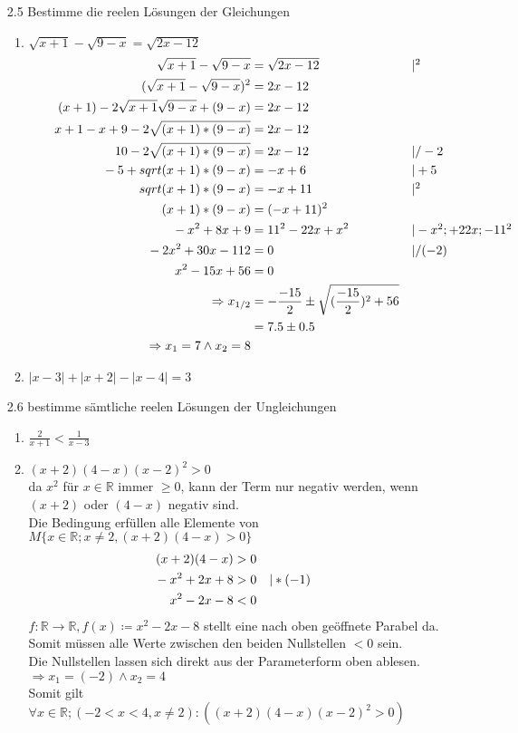 \documentclass[12pt,letterpaper]{article}
\newcommand{\alignleft}[1]{\tag*{\llap{\makebox[\linewidth][l]{$#1$}}}}
\newcommand{\LLeftrightarrow}{ \alignleft{\Leftrightarrow}}
\newcommand{\eqinfo}[1]{&\makebox[2cm][l]{$\vert #1$}}
\newcommand{\Eqn}[3]{#1 &#2 #3}
\newcommand{\eqn}[2]{\LLeftrightarrow\Eqn{#1}{=}{#2}\\}
\newcommand{\eqni}[3]{\LLeftrightarrow\Eqn{#1}{=}{#2}\eqinfo{#3}\\}
\newcommand{\eqnfi}[3]{\Eqn{#1}{=}{#2}\eqinfo{#3}\\}
\newcommand{\geqnf}[3]{\Eqn{#1}{#2}{#3}\\}
\newcommand{\geqn}[3]{\LLeftrightarrow\Eqn{#1}{#2}{#3}\\}
\newcommand{\geqni}[4]{\LLeftrightarrow\Eqn{#1}{#2}{#3}\eqinfo{#4}\\}
\begin{document}
\begin{enumerate}
\item [2.5] Bestimme die reelen Lösungen der Gleichungen
\begin{enumerate}
\item $\sqrt{x+1}-\sqrt{9-x}=\sqrt{2x-12}$
\begin{align*}
\eqnfi{\sqrt{x+1}-\sqrt{9-x}}{\sqrt{2x-12}}{^2}
\eqn{(\sqrt{x+1}-\sqrt{9-x})^2}{2x-12}
\eqn{(x+1)-2\sqrt{x+1}\sqrt{9-x}+(9-x)}{2x-12}
\eqn{x+1-x+9-2\sqrt{(x+1)*(9-x)}}{2x-12}
\eqni{10-2\sqrt{(x+1)*(9-x)}}{2x-12}{/-2}
\eqni{-5+sqrt{(x+1)*(9-x)}}{-x+6}{+5}
\eqni{sqrt{(x+1)*(9-x)}}{-x+11}{^2}
\eqn{(x+1)*(9-x)}{(-x+11)^2}
\eqni{-x^2+8x+9}{11^2-22x+x^2}{-x^2; +22x; -11^2}
\eqni{-2x^2+30x-112}{0}{/(-2)}
\eqn{x^2-15x+56}{0}
\Rightarrow x_{1/2} &= -\frac{-15}{2}\pm\sqrt{(\frac{-15}{2})^2+56}\\
&= 7.5\pm 0.5\\
\Rightarrow x_1=7 \land x_2=8
\end{align*}
\item $|x-3|+|x+2|-|x-4|=3$
\end{enumerate}
\item [2.6] bestimme sämtliche reelen Lösungen der Ungleichungen
\begin{enumerate}
\item $\frac{2}{x+1}<\frac{1}{x-3}$
\item $\left(x+2\right)\left(4-x\right)\left(x-2\right)^2>0$\\
da $x^2$ für $x\in\mathbb{R}$ immer $\geq 0$, kann der Term nur negativ werden, wenn $(x+2)$ oder $(4-x)$ negativ sind.\\
Die Bedingung erfüllen alle Elemente von $M \lbrace x\in\mathbb{R}; x\neq 2, (x+2)(4-x)>0 \rbrace$\\
\begin{align*}
\geqnf{(x+2)(4-x)}{>}{0}
\geqni{-x^2+2x+8}{>}{0}{*(-1)}
\geqn{x^2-2x-8}{<}{0}
\end{align*}
$f: \mathbb{R}\to\mathbb{R}, f(x)\coloneqq x^2-2x-8$ stellt eine nach oben geöffnete Parabel da. Somit müssen alle Werte zwischen den beiden Nullstellen $<0$ sein.\\
Die Nullstellen lassen sich direkt aus der Parameterform oben ablesen.\\
$\Rightarrow x_1=(-2) \land x_2=4$\\
Somit gilt $\forall x\in\mathbb{R};(-2<x<4, x\neq 2):(\left(x+2\right)\left(4-x\right)\left(x-2\right)^2>0)$
\end{enumerate}
\end{enumerate}
\end{document}

